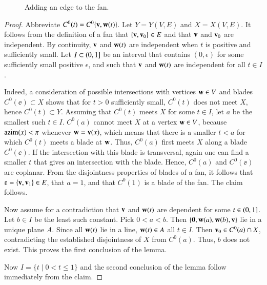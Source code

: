 \begin{figure}[htb]
  \centering
  \caption{Adding an edge to the fan.}
  \label{fig:vt}
\end{figure}


\begin{proof}
Abbreviate $C^0(t) = C^0\{{\mathbf v},{\mathbf w}(t)\}$.
Let $Y = Y(V,E)$ and $X = X(V,E)$.
It follows from the definition of a fan that $\{{\mathbf v},{\mathbf v}_0\}\in E$ and
that ${\mathbf v}$ and ${\mathbf v}_0$ are independent.  By continuity, ${\mathbf v}$ and ${\mathbf w}(t)$
are independent when $t$ is positive and sufficiently small.  
Let $I\subset(0,1]$ be an interval that contains $(0,\epsilon)$ for some sufficiently small positive $\epsilon$, and such that ${\mathbf v}$ and ${\mathbf w}(t)$ are independent for all $t\in I$.

Indeed,  a consideration of possible intersections with vertices ${\mathbf w}\in V$ and blades
$C^0(\ee)\subset X$ shows that for $t>0$ sufficiently small,
$C^0(t)$ does not meet $X$, hence $C^0(t)\subset Y$.  Assuming 
that $C^0(t)$ meets $X$ for some $t\in I$, let $a$
be the smallest such $t\in I$.
$C^0(a)$ cannot meet $X$ at a vertex ${\mathbf w}\in V$, because ${\operatorname{azim}}(x)<\pi$ whenever ${\mathbf w}={\mathbf v}(x)$, 
which means that 
there is a smaller $t<a$ for which $C^0(t)$ meets a blade at ${\mathbf w}$.
Thus, $C^0(a)$ first meets $X$ along a blade $C^0(\ee)$. If
the intersection with this blade is transversal, again one can find a smaller $t$ that
gives an intersection with the blade.  Hence, 
$C^0(a)$ and $C^0(\ee)$ are coplanar.  From the disjointness
properties of blades of a fan, it follows that $\ee = \{\v,\v_1\}\in E$,
that $a=1$, and that $C^0(1)$ is a blade of the fan.  The claim follows.

Now assume for a contradiction that ${\mathbf v}$ and ${\mathbf w}(t)$ are dependent for some $t\in(0,1]$.  Let $b\in I$ be the least such constant.  
Pick $0<a<b$.  Then
$\{{\mathbf 0},{\mathbf w}(a),{\mathbf w}(b),{\mathbf v}\}$ lie in a unique plane $A$.  Since all ${\mathbf w}(t)$
lie in a line,  ${\mathbf w}(t)\in A$ all $t\in I$.  Then ${\mathbf v}_0\in C^0(a)\cap X$,
contradicting the established disjointness of $X$ from $C^0(a)$.  Thus, $b$ does not exist.  This proves the first conclusion of the lemma.  

Now $I= \{t\mid 0 < t \le 1\}$ and the second conclusion of the lemma follow immediately from the claim.
\end{proof}

